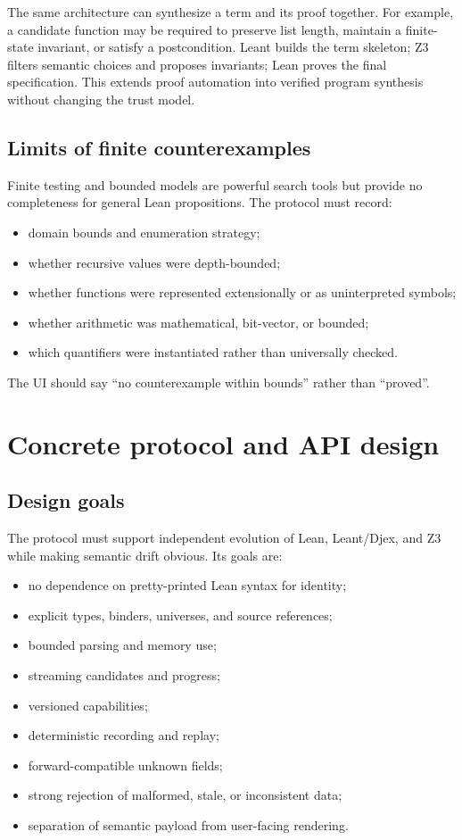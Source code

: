 \documentclass[11pt,letterpaper,openany]{report}
\begin{document}
The same architecture can synthesize a term and its proof together. For example, a
candidate function may be required to preserve list length, maintain a finite-state
invariant, or satisfy a postcondition. Leant builds the term skeleton; Z3 filters
semantic choices and proposes invariants; Lean proves the final specification. This
extends proof automation into verified program synthesis without changing the trust
model.

\section{Limits of finite counterexamples}

Finite testing and bounded models are powerful search tools but provide no completeness
for general Lean propositions. The protocol must record:

\begin{itemize}
  \item domain bounds and enumeration strategy;
  \item whether recursive values were depth-bounded;
  \item whether functions were represented extensionally or as uninterpreted symbols;
  \item whether arithmetic was mathematical, bit-vector, or bounded;
  \item which quantifiers were instantiated rather than universally checked.
\end{itemize}

The UI should say ``no counterexample within bounds'' rather than ``proved''.


\chapter{Concrete protocol and API design}
\label{ch:protocol}

\section{Design goals}

The protocol must support independent evolution of Lean, Leant/Djex, and Z3 while
making semantic drift obvious. Its goals are:

\begin{itemize}
  \item no dependence on pretty-printed Lean syntax for identity;
  \item explicit types, binders, universes, and source references;
  \item bounded parsing and memory use;
  \item streaming candidates and progress;
  \item versioned capabilities;
  \item deterministic recording and replay;
  \item forward-compatible unknown fields;
  \item strong rejection of malformed, stale, or inconsistent data;
  \item separation of semantic payload from user-facing rendering.
\end{itemize}
\end{document}
